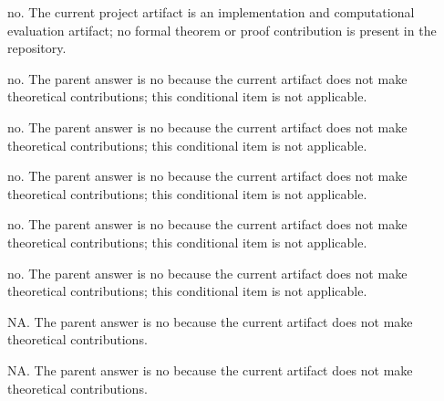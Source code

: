 \documentclass[letterpaper]{article}
\begin{document}
\begin{itemize}

no. The current project artifact is an implementation and computational evaluation artifact; no formal theorem or proof contribution is present in the repository.

        \begin{itemize}
	
	no. The parent answer is no because the current artifact does not make theoretical contributions; this conditional item is not applicable.

	no. The parent answer is no because the current artifact does not make theoretical contributions; this conditional item is not applicable.

	no. The parent answer is no because the current artifact does not make theoretical contributions; this conditional item is not applicable.

	no. The parent answer is no because the current artifact does not make theoretical contributions; this conditional item is not applicable.

	no. The parent answer is no because the current artifact does not make theoretical contributions; this conditional item is not applicable.

	NA. The parent answer is no because the current artifact does not make theoretical contributions.

	NA. The parent answer is no because the current artifact does not make theoretical contributions.
	
	\end{itemize}
\end{itemize}
\end{document}
